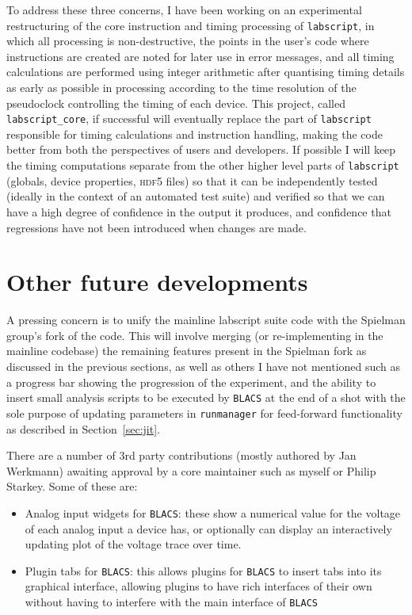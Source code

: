 To address these three concerns, I have been working on an experimental restructuring of the core instruction and timing processing of \texttt{labscript}, in which all processing is non-destructive, the points in the user's code where instructions are created are noted for later use in error messages, and all timing calculations are performed using integer arithmetic after quantising timing details as early as possible in processing according to the time resolution of the pseudoclock controlling the timing of each device. This project, called \texttt{labscript\_core}, if successful will eventually replace the part of \texttt{labscript} responsible for timing calculations and instruction handling, making the code better from both the perspectives of users and developers. If possible I will keep the timing computations separate from the other higher level parts of \texttt{labscript} (globals, device properties, \textsc{hdf5} files) so that it can be independently tested (ideally in the context of an automated test suite) and verified so that we can have a high degree of confidence in the output it produces, and confidence that regressions have not been introduced when changes are made.


\section{Other future developments}

A pressing concern is to unify the mainline labscript suite code with the Spielman group's fork of the code. This will involve merging (or re-implementing in the mainline codebase) the remaining features present in the Spielman fork as discussed in the previous sections, as well as others I have not mentioned such as a progress bar showing the progression of the experiment, and the ability to insert small analysis scripts to be executed by \texttt{BLACS} at the end of a shot with the sole purpose of updating parameters in \texttt{runmanager} for feed-forward functionality as described in Section~\ref{sec:jit}.

There are a number of 3rd party contributions (mostly authored by Jan Werkmann) awaiting approval by a core maintainer such as myself or Philip Starkey. Some of these are:
\begin{itemize}
    \item Analog input widgets for \texttt{BLACS}: these show a numerical value for the voltage of each analog input a device has, or optionally can display an interactively updating plot of the voltage trace over time.
    \item Plugin tabs for \texttt{BLACS}: this allows plugins for \texttt{BLACS} to insert tabs into its graphical interface, allowing plugins to have rich interfaces of their own without having to interfere with the main interface of \texttt{BLACS}
\end{itemize}

